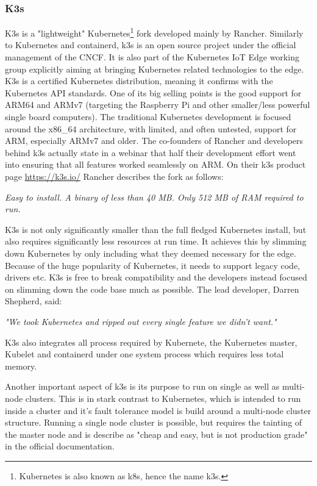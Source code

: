 \subsubsection{K3s}
K3s is a "lightweight" Kubernetes\footnote{Kubernetes is also known as k8s, hence the name k3s.} fork developed mainly by Rancher\cite{rancherMainPage:online}. Similarly to Kubernetes and containerd, k3s is an open source project under the official management of the CNCF. It is also part of the Kubernetes IoT Edge working group explicitly aiming at bringing Kubernetes related technologies to the edge. K3s is a certified Kubernetes distribution, meaning it confirms with the Kubernetes API standards. One of its big selling points is the good support for ARM64 and ARMv7 (targeting the Raspberry Pi and other smaller/less powerful single board computers). The traditional Kubernetes development is focused around the x86\_64 architecture, with limited, and often untested, support for ARM, especially ARMv7 and older. The co-founders of Rancher and developers behind k3s actually state in a webinar that half their development effort went into ensuring that all features worked seamlessly on ARM\cite{k3sTalk:online}.
On their k3s product page \url{https://k3s.io/} Rancher describes the fork as follows:
\begin{displayquote}
\textit{Easy to install. A binary of less than 40 MB. Only 512 MB of RAM required to run.}
\end{displayquote}
K3s is not only significantly smaller than the full fledged Kubernetes install, but also requires significantly less resources at run time. It achieves this by slimming down Kubernetes by only including what they deemed necessary for the edge. Because of the huge popularity of Kubernetes, it needs to support legacy code, drivers etc. K3s is free to break compatibility and the developers instead focused on slimming down the code base much as possible. The lead developer, Darren Shepherd, said:
\begin{displayquote}
\textit{"We took Kubernetes and ripped out every single feature we didn't want.\cite{k3sTalk:online}"}
\\[1pt]
\end{displayquote}

K3s also integrates all process required by Kubernete, the Kubernetes master, Kubelet and containerd under one system process which requires less total memory.

Another important aspect of k3s is its purpose to run on single as well as multi-node clusters. This is in stark contrast to Kubernetes, which is intended to run inside a cluster and it's fault tolerance model is build around a multi-node cluster structure. Running a single node cluster is possible, but requires the tainting of the master node and is describe as "cheap and easy, but is not production grade" in the official documentation\cite{singleNodeKubernetesNotProductionDocumenhtation:online}.

